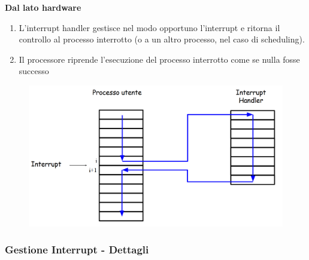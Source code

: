 \textbf{Dal lato hardware}
\begin{enumerate}
    \item L'interrupt handler gestisce nel modo opportuno l'interrupt e ritorna il controllo al processo interrotto (o a un altro processo, nel caso di scheduling).
    \item Il processore riprende l'esecuzione del processo interrotto come se nulla fosse successo
\end{enumerate}
\newpage
\begin{figure} [h]
    \centering
    \includegraphics[width=0.7\linewidth]{Images/Screenshot 2024-12-16 132614.png}
    \label{fig:interrupt1}
\end{figure}

\subsubsection{Gestione Interrupt - Dettagli}

